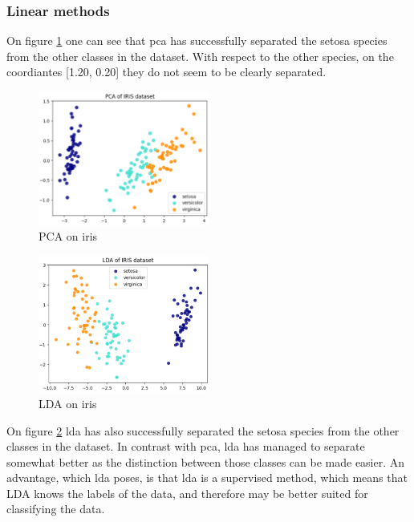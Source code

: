 \subsubsection{Linear methods}\label{subsubsec:linear-methods-on-iris}
On figure \ref{fig:iris-pca} one can see that \gls{pca} has successfully separated the setosa species from the other classes in the dataset. With respect to the other species, on the coordiantes [1.20, 0.20] they do not seem to be clearly separated.

\begin{figure}[h]
\centering
\includegraphics[width=0.5\textwidth]{figures/theory-example-figures/iris-pca.png}
\caption{PCA on iris}
\label{fig:iris-pca}
\end{figure}


\begin{figure}[h]
    \centering
    \includegraphics[width=0.5\textwidth]{figures/theory-example-figures/iris-lda.png}
    \caption{LDA on iris}
    \label{fig:iris-lda}
    \end{figure}
    
On figure \ref{fig:iris-lda} \gls{lda} has also successfully separated the setosa species from the other classes in the dataset. In contrast with \gls{pca}, \gls{lda} has managed to separate somewhat better as the distinction between those classes can be made easier. An advantage, which \gls{lda} poses, is that \gls{lda} is a supervised method, which means that LDA knows the labels of the data, and therefore may be better suited for classifying the data.

